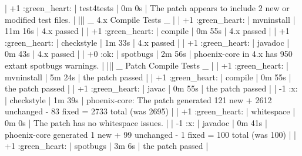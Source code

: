 \documentclass{report}%
\begin{document}
\begin{enumerate}
\newline%
   | +1 :green\_heart: |  test4tests  |   0m  0s |  The patch appears to include 2 new or modified test files.  |\newline%
\newline%
   ||| \_ 4.x Compile Tests \_ |\newline%
\newline%
   | +1 :green\_heart: |  mvninstall  |  11m 16s |  4.x passed  |\newline%
\newline%
   | +1 :green\_heart: |  compile  |   0m 55s |  4.x passed  |\newline%
\newline%
   | +1 :green\_heart: |  checkstyle  |   1m 33s |  4.x passed  |\newline%
\newline%
   | +1 :green\_heart: |  javadoc  |   0m 43s |  4.x passed  |\newline%
\newline%
   | +0 :ok: |  spotbugs  |   2m 56s |  phoenix{-}core in 4.x has 950 extant spotbugs warnings.  |\newline%
\newline%
   ||| \_ Patch Compile Tests \_ |\newline%
\newline%
   | +1 :green\_heart: |  mvninstall  |   5m 24s |  the patch passed  |\newline%
\newline%
   | +1 :green\_heart: |  compile  |   0m 55s |  the patch passed  |\newline%
\newline%
   | +1 :green\_heart: |  javac  |   0m 55s |  the patch passed  |\newline%
\newline%
   | {-}1 :x: |  checkstyle  |   1m 39s |  phoenix{-}core: The patch generated 121 new + 2612 unchanged {-} 83 fixed = 2733 total (was 2695)  |\newline%
\newline%
   | +1 :green\_heart: |  whitespace  |   0m  0s |  The patch has no whitespace issues.  |\newline%
\newline%
   | {-}1 :x: |  javadoc  |   0m 41s |  phoenix{-}core generated 1 new + 99 unchanged {-} 1 fixed = 100 total (was 100)  |\newline%
\newline%
   | +1 :green\_heart: |  spotbugs  |   3m  6s |  the patch passed  |\newline%

\end{enumerate}
\end{document}
